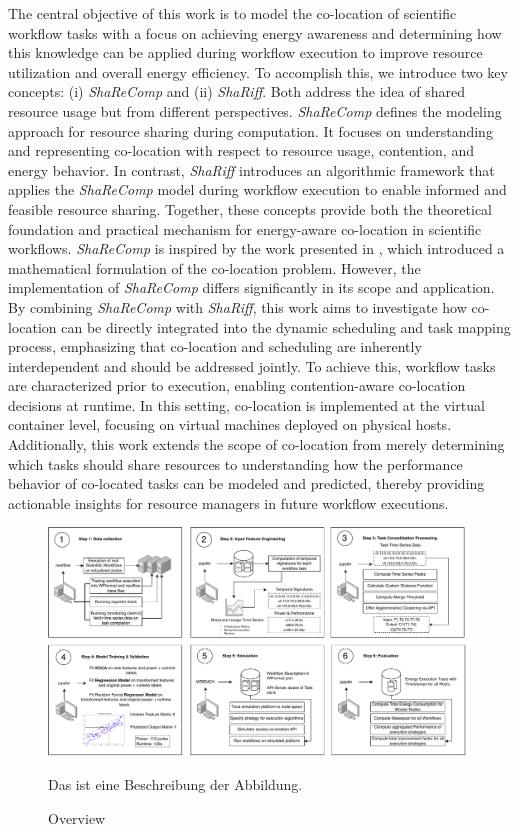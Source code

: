 The central objective of this work is to model the co-location of scientific workflow tasks with a focus on achieving energy awareness and determining how this knowledge can be applied during workflow execution to improve resource utilization and overall energy efficiency. To accomplish this, we introduce two key concepts: (i) \textit{ShaReComp} and (ii) \textit{ShaRiff}. Both address the idea of shared resource usage but from different perspectives. \textit{ShaReComp} defines the modeling approach for resource sharing during computation. It focuses on understanding and representing co-location with respect to resource usage, contention, and energy behavior. In contrast, \textit{ShaRiff} introduces an algorithmic framework that applies the \textit{ShaReComp} model during workflow execution to enable informed and feasible resource sharing. Together, these concepts provide both the theoretical foundation and practical mechanism for energy-aware co-location in scientific workflows.
\textit{ShaReComp} is inspired by the work presented in \cite{5644899}, which introduced a mathematical formulation of the co-location problem. However, the implementation of \textit{ShaReComp} differs significantly in its scope and application. By combining \textit{ShaReComp} with \textit{ShaRiff}, this work aims to investigate how co-location can be directly integrated into the dynamic scheduling and task mapping process, emphasizing that co-location and scheduling are inherently interdependent and should be addressed jointly. To achieve this, workflow tasks are characterized prior to execution, enabling contention-aware co-location decisions at runtime. In this setting, co-location is implemented at the virtual container level, focusing on virtual machines deployed on physical hosts. Additionally, this work extends the scope of co-location from merely determining which tasks should share resources to understanding how the performance behavior of co-located tasks can be modeled and predicted, thereby providing actionable insights for resource managers in future workflow executions.

\begin{figure}[H]
    \centering
    \includegraphics[scale=0.45]{fig/04/04-overview.pdf}
    \small
    \caption{Overview}
    \label{fig:04-overview}
    \tiny
    Das ist eine Beschreibung der Abbildung.
\end{figure}

